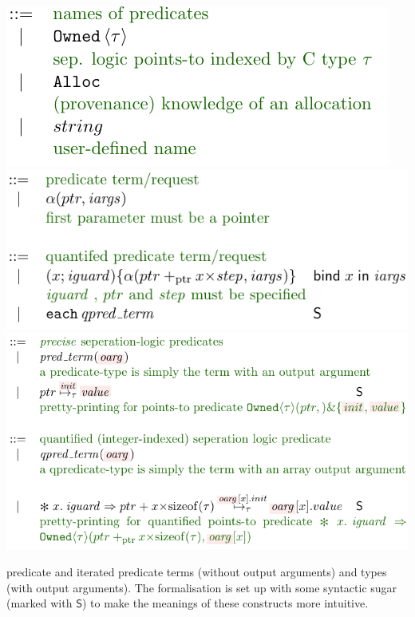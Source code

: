 \begin{marginfigure}
    \centering
    \includegraphics{figures/kernel-pred-name}
    \includegraphics{figures/kernel-qpred-term}
    \includegraphics{figures/kernel-qpred}
    \caption{ predicate and iterated predicate terms (without
        output arguments) and types (with output arguments). The formalisation
        is set up with some syntactic sugar (marked with $\mathsf{S}$) to make
        the meanings of these constructs more intuitive.}\label{fig:kernel-qpred}

\end{marginfigure}

